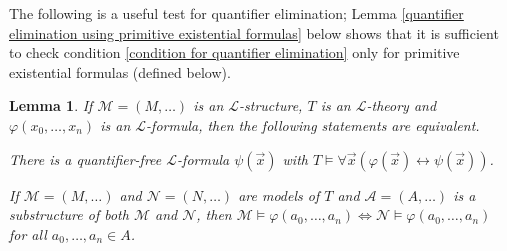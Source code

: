 \documentclass[10pt]{amsart}
\renewcommand{\L}{\mathcal{L}}
\newcommand{\MM}{\mathcal{M}}
\newcommand{\NN}{\mathcal{N}}
\renewcommand{\AA}{\mathcal{A}}
\newtheorem{lemma}[theorem]{Lemma}
\theoremstyle{definition}
\theoremstyle{remark}
\newenvironment{enumerate-(a)}{\begin{enumerate}[label={\upshape (\alph*)}, leftmargin=2pc]}{\end{enumerate}}
\begin{document}
The following is a useful test for quantifier elimination; Lemma \ref{quantifier elimination using primitive existential formulas} below shows that it is sufficient to check condition \ref{condition for quantifier elimination} only for primitive existential formulas (defined below). 

\begin{lemma} \label{criterion for quantifier elimination} 
If $\MM=(M,\dots)$ is an $\L$-structure, $T$ is an $\L$-theory and $\varphi(x_0,\dots,x_n)$ is an $\L$-formula, then the following statements are equivalent. 
\begin{enumerate-(a)} 
\item 
There is a quantifier-free $\L$-formula $\psi(\vec{x})$ with $T\models \forall \vec{x}(\varphi(\vec{x})\leftrightarrow\psi(\vec{x}))$. 
\item \label{condition for quantifier elimination} 
If $\MM=(M,\dots)$ and $\NN=(N,\dots)$ are models of $T$ and $\AA=(A,\dots)$ is a substructure of both $\MM$ and $\NN$, then $\MM\models\varphi(a_0,\dots,a_n)\Leftrightarrow\NN\models \varphi(a_0,\dots,a_n)$ for all $a_0,\dots,a_n\in A$. 
\end{enumerate-(a)} 
\end{lemma} 
\end{document}
